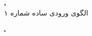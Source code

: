         \begin{figure}[H]
            \centering
            \begin{adjustbox}{minipage=\linewidth,scale=0.5}
                \begin{subfigure}[b]{0.4\textwidth}
                    \centering
                    \includegraphics[width=\textwidth]{images/pattern1.png}
                    \caption{الگوی ورودی ساده شماره ۱}
                    \label{fig:simple-pattern1}
                \end{subfigure}
                \hfill
                \begin{subfigure}[b]{0.4\textwidth}
                    \centering
                    \includegraphics[width=\textwidth]{images/pattern2.png}

\end{subfigure}
\end{adjustbox}
\end{figure}
